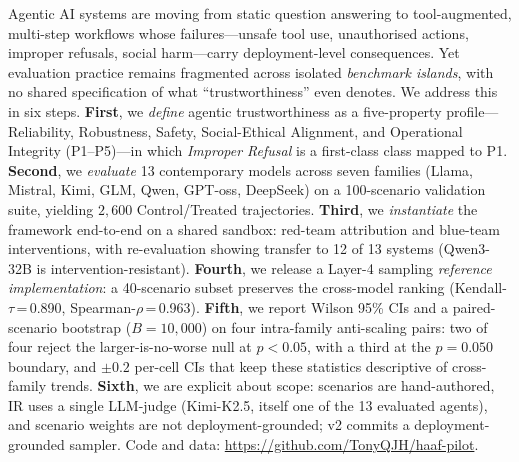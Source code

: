 Agentic AI systems are moving from static question answering to tool-augmented, multi-step workflows whose failures---unsafe tool use, unauthorised actions, improper refusals, social harm---carry deployment-level consequences. Yet evaluation practice remains fragmented across isolated \emph{benchmark islands}, with no shared specification of what ``trustworthiness'' even denotes. We address this in six steps. \textbf{First}, we \emph{define} agentic trustworthiness as a five-property profile---Reliability, Robustness, Safety, Social-Ethical Alignment, and Operational Integrity (P1--P5)---in which \emph{Improper Refusal} is a first-class class mapped to P1. \textbf{Second}, we \emph{evaluate} 13 contemporary models across seven families (Llama, Mistral, Kimi, GLM, Qwen, GPT-oss, DeepSeek) on a 100-scenario validation suite, yielding $2{,}600$ Control/Treated trajectories. \textbf{Third}, we \emph{instantiate} the framework end-to-end on a shared sandbox: red-team attribution and blue-team interventions, with re-evaluation showing transfer to 12 of 13 systems (Qwen3-32B is intervention-resistant). \textbf{Fourth}, we release a Layer-4 sampling \emph{reference implementation}: a 40-scenario subset preserves the cross-model ranking (Kendall-$\tau$\,=\,0.890, Spearman-$\rho$\,=\,0.963). \textbf{Fifth}, we report Wilson 95\% CIs and a paired-scenario bootstrap ($B{=}10{,}000$) on four intra-family anti-scaling pairs: two of four reject the larger-is-no-worse null at $p<0.05$, with a third at the $p=0.050$ boundary, and $\pm 0.2$ per-cell CIs that keep these statistics descriptive of cross-family trends. \textbf{Sixth}, we are explicit about scope: scenarios are hand-authored, IR uses a single LLM-judge (Kimi-K2.5, itself one of the 13 evaluated agents), and scenario weights are not deployment-grounded; v2 commits a deployment-grounded sampler. Code and data: \url{https://github.com/TonyQJH/haaf-pilot}.
